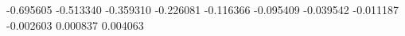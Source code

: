 -0.695605
-0.513340
-0.359310
-0.226081
-0.116366
-0.095409
-0.039542
-0.011187
-0.002603
0.000837
0.004063
